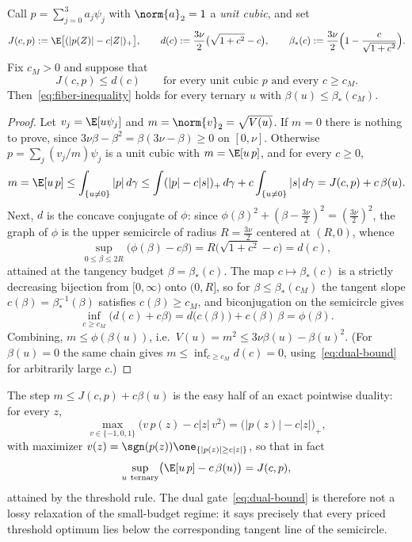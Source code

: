 \begin{lemma}\label{lem:dual-splice}
Call $p=\sum_{j=0}^3a_j\psi_j$ with $\norm{a}_2=1$ a \emph{unit cubic}, and set
\[
        J(c,p):=\E\bigl[(|p(Z)|-c|Z|)_+\bigr],
        \qquad
        d(c):=\frac{3\nu}{2}\bigl(\sqrt{1+c^2}-c\bigr),
        \qquad
        \beta_*(c):=\frac{3\nu}{2}\Bigl(1-\frac{c}{\sqrt{1+c^2}}\Bigr).
\]
Fix $c_M>0$ and suppose that
\begin{equation}
        J(c,p)\le d(c)
        \qquad\text{for every unit cubic } p \text{ and every } c\ge c_M.
        \label{eq:dual-bound}
\end{equation}
Then~\eqref{eq:fiber-inequality} holds for every ternary $u$ with $\beta(u)\le\beta_*(c_M)$.
\end{lemma}

\begin{proof}
Let $v_j=\E[u\psi_j]$ and $m=\norm{v}_2=\sqrt{V(u)}$. If $m=0$ there is nothing to prove, since $3\nu\beta-\beta^2=\beta(3\nu-\beta)\ge0$ on $[0,\nu]$. Otherwise $p=\sum_j(v_j/m)\psi_j$ is a unit cubic with $m=\E[u\,p]$, and for every $c\ge0$,
\[
        m=\E[u\,p]\le\int_{\{u\neq0\}}|p|\,d\gamma
        \le\int(|p|-c|s|)_+\,d\gamma+c\int_{\{u\neq0\}}|s|\,d\gamma
        =J(c,p)+c\,\beta(u).
\]
Next, $d$ is the concave conjugate of $\phi$: since $\phi(\beta)^2+(\beta-\tfrac{3\nu}{2})^2=(\tfrac{3\nu}{2})^2$, the graph of $\phi$ is the upper semicircle of radius $R=\tfrac{3\nu}{2}$ centered at $(R,0)$, whence
\[
        \sup_{0\le\beta\le2R}\bigl(\phi(\beta)-c\beta\bigr)=R\bigl(\sqrt{1+c^2}-c\bigr)=d(c),
\]
attained at the tangency budget $\beta=\beta_*(c)$. The map $c\mapsto\beta_*(c)$ is a strictly decreasing bijection from $[0,\infty)$ onto $(0,R]$, so for $\beta\le\beta_*(c_M)$ the tangent slope $c(\beta)=\beta_*^{-1}(\beta)$ satisfies $c(\beta)\ge c_M$, and biconjugation on the semicircle gives
\[
        \inf_{c\ge c_M}\bigl(d(c)+c\beta\bigr)=d\bigl(c(\beta)\bigr)+c(\beta)\,\beta=\phi(\beta).
\]
Combining, $m\le\phi(\beta(u))$, i.e.\ $V(u)=m^2\le3\nu\beta(u)-\beta(u)^2$. (For $\beta(u)=0$ the same chain gives $m\le\inf_{c\ge c_M}d(c)=0$, using~\eqref{eq:dual-bound} for arbitrarily large $c$.)
\end{proof}

\begin{remark}\label{rem:exactness}
The step $m\le J(c,p)+c\beta(u)$ is the easy half of an exact pointwise duality: for every $z$,
\[
        \max_{v\in\{-1,0,1\}}\bigl(v\,p(z)-c|z|\,v^2\bigr)=\bigl(|p(z)|-c|z|\bigr)_+,
\]
with maximizer $v(z)=\sgn(p(z))\one_{\{|p(z)|\ge c|z|\}}$, so that in fact
\[
        \sup_{u\ \text{ternary}}\bigl(\E[u\,p]-c\,\beta(u)\bigr)=J(c,p),
\]
attained by the threshold rule. The dual gate~\eqref{eq:dual-bound} is therefore not a lossy relaxation of the small-budget regime: it says precisely that every priced threshold optimum lies below the corresponding tangent line of the semicircle.
\end{remark}

